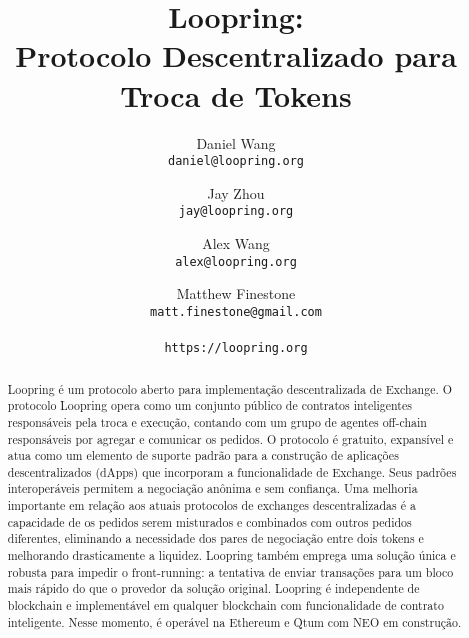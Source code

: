 \documentclass[UTF8,nofonts]{article}
\title{\textbf{Loopring:}\\\textbf{Protocolo Descentralizado para Troca de Tokens}}
\author{
  Daniel Wang\\
  \texttt{daniel@loopring.org}\\
  \and
  	Jay Zhou\\
  	\texttt{jay@loopring.org}\\
  	\and
  	Alex Wang\\
  	\texttt{alex@loopring.org}\\
  	\and
  	Matthew Finestone\\
  	\texttt{matt.finestone@gmail.com}\\ 
  \\
  \texttt{https://loopring.org}
 }
\begin{document}
\maketitle


\begin{abstract}
Loopring é um protocolo aberto para implementação descentralizada de Exchange. O protocolo Loopring opera como um conjunto público de contratos inteligentes responsáveis pela troca e execução, contando com um grupo de agentes off-chain responsáveis por agregar e comunicar os pedidos. O protocolo é gratuito, expansível e atua como um elemento de suporte padrão para a construção de aplicações descentralizados (dApps) que incorporam a funcionalidade de Exchange. Seus padrões interoperáveis permitem a negociação anônima e sem confiança. Uma melhoria importante em relação aos atuais protocolos de exchanges descentralizadas é a capacidade de os pedidos serem misturados e combinados com outros pedidos diferentes, eliminando a necessidade dos pares de negociação entre dois tokens e melhorando drasticamente a liquidez. Loopring também emprega uma solução única e robusta para impedir o front-running: a tentativa de enviar transações para um bloco mais rápido do que o provedor da solução original. Loopring é independente de blockchain e implementável em qualquer blockchain com funcionalidade de contrato inteligente. Nesse momento, é operável na Ethereum\cite{buterin2017ethereum} \cite{wood2014ethereum} e Qtum \cite{dai2017smart} com NEO \cite{atterlonn2018distributed} em construção.
\end{abstract}
\end{document}
